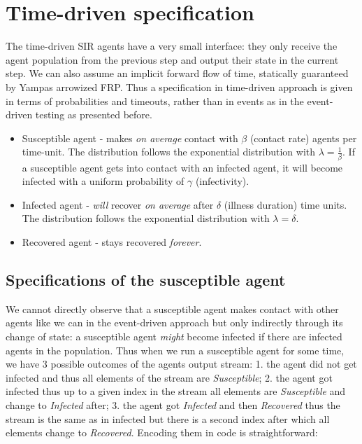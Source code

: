 \section{Time-driven specification}
\label{sec:timedriven_specification}
The time-driven SIR agents have a very small interface: they only receive the agent population from the previous step and output their state in the current step. We can also assume an implicit forward flow of time, statically guaranteed by Yampas arrowized FRP. Thus a specification in time-driven approach is given in terms of probabilities and timeouts, rather than in events as in the event-driven testing as presented before.

\begin{itemize}
	\item Susceptible agent - makes \textit{on average} contact with $\beta$ (contact rate) agents per time-unit. The distribution follows the exponential distribution with $\lambda = \frac{1}{\beta}$. If a susceptible agent gets into contact with an infected agent, it will become infected with a uniform probability of $\gamma$ (infectivity).
	
	\item Infected agent - \textit{will} recover \textit{on average} after $\delta$ (illness duration) time units. The distribution follows the exponential distribution with $\lambda = \delta$.

	\item Recovered agent - stays recovered \textit{forever}.
\end{itemize}

\subsection{Specifications of the susceptible agent}
We cannot directly observe that a susceptible agent makes contact with other agents like we can in the event-driven approach but only indirectly through its change of state: a susceptible agent \textit{might} become infected if there are infected agents in the population.
Thus when we run a susceptible agent for some time, we have 3 possible outcomes of the agents output stream: 1. the agent did not get infected and thus all elements of the stream are \textit{Susceptible}; 2. the agent got infected thus up to a given index in the stream all elements are \textit{Susceptible} and change to \textit{Infected} after; 3. the agent got \textit{Infected} and then \textit{Recovered} thus the stream is the same as in infected but there is a second index after which all elements change to \textit{Recovered}. Encoding them in code is straightforward:

